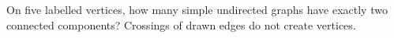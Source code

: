 On five labelled vertices, how many simple undirected graphs have exactly two connected components? Crossings of drawn edges do not create vertices.
